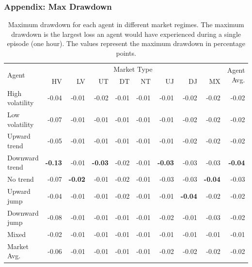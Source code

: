 \documentclass{beamer}
\begin{document}
\begin{frame}
  \frametitle{Appendix: Max Drawdown}

  \begin{table}[htbp]
    \fontsize{7}{9}\selectfont
    \centering
    \caption[Maximum Drawdown]{Maximum drawdown for each agent in different market regimes. The maximum drawdown is the largest loss an agent would have experienced during a single episode (one hour). The values represent the maximum drawdown in percentage points.}
    \begin{tabular}{l|rrrrrrrr|r}
    \hline
    \multirow{2}{*}{Agent} & \multicolumn{8}{c|}{Market Type} & \multirow{2}{*}{Agent Avg.} \\
    \cline{2-9}
    & HV &  LV &  UT &  DT &  NT &  UJ &  DJ & MX \\
    \hline
    High volatility &     -0.04 &    -0.01 &     -0.02 &       -0.01 &     -0.01 &    -0.01 &      -0.02 &  -0.02 &       -0.02 \\
    Low volatility  &     -0.07 &    -0.01 &     -0.01 &       -0.01 &     -0.01 &    -0.01 &      -0.02 &  -0.02 &       -0.02 \\
    Upward trend    &     -0.05 &    -0.01 &     -0.01 &       -0.01 &     -0.01 &    -0.01 &      -0.02 &  -0.02 &       -0.02 \\
    Downward trend  &     \textbf{-0.13} &    -0.01 &     \textbf{-0.03} &       -0.02 &     -0.01 &    \textbf{-0.03} &      -0.03 &  -0.03 &       \textbf{-0.04} \\
    No trend        &     -0.07 &    \textbf{-0.02} &     -0.01 &       -0.02 &     -0.01 &    -0.03 &      -0.03 &  \textbf{-0.04} &       -0.03 \\
    Upward jump     &     -0.04 &    -0.01 &     -0.01 &       -0.02 &     -0.01 &    -0.01 &      \textbf{-0.04} &  -0.02 &       -0.02 \\
    Downward jump   &     -0.08 &    -0.01 &     -0.01 &       -0.01 &     -0.01 &    -0.02 &      -0.01 &  -0.03 &       -0.02 \\
    Mixed           &     -0.02 &    -0.01 &     -0.01 &       -0.01 &     -0.01 &    -0.01 &      -0.01 &  -0.01 &       -0.01 \\
    \hline
    Market Avg.     &     -0.06 &    -0.01 &     -0.01 &       -0.01 &     -0.01 &    -0.02 &      -0.02 &  -0.02 &       -0.02 \\
    \end{tabular}
  \end{table}
\end{frame}
\end{document}
